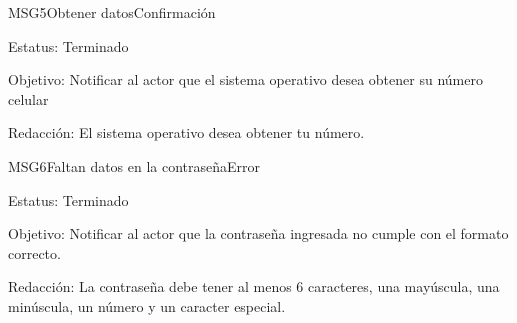 \begin{mensaje}{MSG5}{Obtener datos}{Confirmación}
	\item[Estatus:] Terminado
	\item[Objetivo:] Notificar al actor que el sistema operativo desea obtener su número celular
	\item[Redacción:] El sistema operativo desea obtener tu número.
\end{mensaje}

\begin{mensaje}{MSG6}{Faltan datos en la contraseña}{Error}
	\item[Estatus:] Terminado
	\item[Objetivo:] Notificar al actor que la contraseña ingresada no cumple con el formato correcto.
	\item[Redacción:] La contraseña debe tener al menos 6 caracteres, una mayúscula, una minúscula, un número y un caracter especial.
\end{mensaje}


